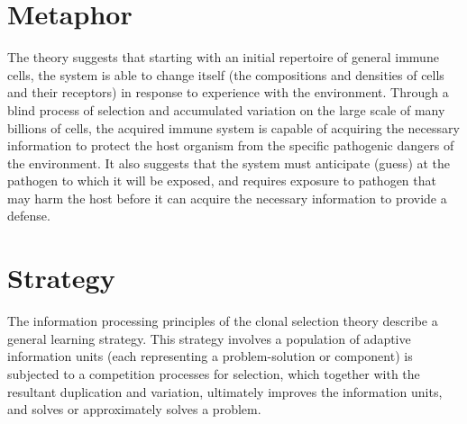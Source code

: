 \documentclass[a4paper, 11pt]{article}
\begin{document}
\section{Metaphor}
\label{sec:metaphor}
The theory suggests that starting with an initial repertoire of general immune cells, the system is able to change itself (the compositions and densities of cells and their receptors) in response to experience with the environment. Through a blind process of selection and accumulated variation on the large scale of many billions of cells, the acquired immune system is capable of acquiring the necessary information to protect the host organism from the specific pathogenic dangers of the environment. It also suggests that the system must anticipate (guess) at the pathogen to which it will be exposed, and requires exposure to pathogen that may harm the host before it can acquire the necessary information to provide a defense.

\section{Strategy}
\label{sec:strategy}
The information processing principles of the clonal selection theory describe a general learning strategy.
This strategy involves a population of adaptive information units (each representing a problem-solution or component) is subjected to a competition processes for selection, which together with the resultant duplication and variation, ultimately improves the information units, and solves or approximately solves a problem.

\end{document}

